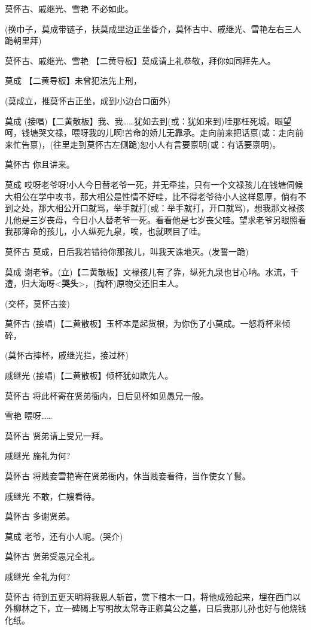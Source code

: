 莫怀古、戚继光、雪艳 不必如此。

(换巾子，莫成带链子，扶莫成里边正坐昏介，莫怀古中、戚继光、雪艳左右三人跪朝里拜)

莫怀古、戚继光、雪艳 【二黄导板】莫成请上礼恭敬，拜你如同拜先人。

莫成 【二黄导板】未曾犯法先上刑，

(莫成立，推莫怀古正坐，成到小边台口面外)

莫成
(接唱)【二黄散板】我、我\ldots{}\ldots{}犹如去到(或：犹如来到)哇那枉死城。眼望呵，钱塘哭文禄，喂呀我的儿啊!苦命的娇儿无靠承。走向前来把话禀(或：走向前来忙告禀)，(往里走到莫怀古左侧跪)恕小人有言要禀明(或：有话要禀明)。

莫怀古 你且讲来。

莫成
哎呀老爷呀!小人今日替老爷一死，并无牵挂，只有一个文禄孩儿在钱塘伺候大相公在学中攻书，那大相公是性情不好哇，比不得老爷待小人这样恩厚，倘有不到之处，那大相公开口就骂，举手就打(或：举手就打，开口就骂)，想我那文禄孩儿他是三岁丧母，今日小人替老爷一死。看看他是七岁丧父哇。望求老爷另眼照看我那薄命的孩儿，小人纵死九泉，唉，也就瞑目了哇。

莫怀古 莫成，日后我若错待你那孩儿，叫我天诛地灭。(发誓一跪)

莫成
谢老爷。(立)【二黄散板】文禄孩儿有了靠，纵死九泉也甘心呐。水流，千遭，归大海呀\textless{}\textbf{哭头}\textgreater{}，(掏杯)原物交还旧主人。

(交杯，莫怀古接)

莫怀古
(接唱)【二黄散板】玉杯本是起货根，为你伤了小莫成。一怒将杯来倾碎，

(莫怀古摔杯，戚继光拦，接过杯)

戚继光 (接唱)【二黄散板】倾杯犹如欺先人。

莫怀古 将此杯寄在贤弟衙内，日后见杯如见愚兄一般。

雪艳 喂呀\ldots{}\ldots{}

莫怀古 贤弟请上受兄一拜。

戚继光 施礼为何?

莫怀古 将贱妾雪艳寄在贤弟衙内，休当贱妾看待，当作使女丫鬟。

戚继光 不敢，仁嫂看待。

莫怀古 多谢贤弟。

莫成 老爷，还有小人呢。(哭介)

莫怀古 贤弟受愚兄全礼。

戚继光 全礼为何?

莫怀古
待到五更天明将我恩人斩首，赏下棺木一口，将他成殓起来，埋在西门以外柳林之下，立一碑碣上写明故太常寺正卿莫公之墓，日后我那儿孙也好与他烧钱化纸。

